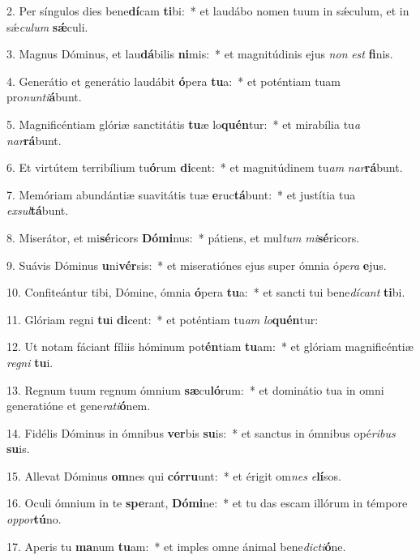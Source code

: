 2. Per síngulos dies bene\textbf{dí}cam \textbf{ti}bi:~*  et laudábo nomen tuum in sǽculum, et in sǽ\textit{cu}\textit{lum} \textbf{sǽ}culi.\

3. Magnus Dóminus, et lau\textbf{dá}bilis \textbf{ni}mis:~*  et magnitúdinis ejus \textit{non} \textit{est} \textbf{fi}nis.\

4. Generátio et generátio laudábit \textbf{ó}pera \textbf{tu}a:~*  et poténtiam tuam pro\textit{nun}\textit{ti}\textbf{á}bunt.\

5. Magnificéntiam glóriæ sanctitátis \textbf{tu}æ lo\textbf{quén}tur:~*  et mirabília tu\textit{a} \textit{nar}\textbf{rá}bunt.\

6. Et virtútem terribílium tu\textbf{ó}rum \textbf{di}cent:~*  et magnitúdinem tu\textit{am} \textit{nar}\textbf{rá}bunt.\

7. Memóriam abundántiæ suavitátis tuæ \textbf{e}ruc\textbf{tá}bunt:~*  et justítia tua \textit{ex}\textit{sul}\textbf{tá}bunt.\

8. Miserátor, et mi\textbf{sé}ricors \textbf{Dó}\textbf{mi}nus:~*  pátiens, et mul\textit{tum} \textit{mi}\textbf{sé}ricors.\

9. Suávis Dóminus \textbf{u}ni\textbf{vér}sis:~*  et miseratiónes ejus super ómnia ó\textit{pe}\textit{ra} \textbf{e}jus.\

10. Confiteántur tibi, Dómine, ómnia \textbf{ó}pera \textbf{tu}a:~*  et sancti tui bene\textit{dí}\textit{cant} \textbf{ti}bi.\

11. Glóriam regni \textbf{tu}i \textbf{di}cent:~*  et poténtiam tu\textit{am} \textit{lo}\textbf{quén}tur:\

12. Ut notam fáciant fíliis hóminum pot\textbf{én}tiam \textbf{tu}am:~*  et glóriam magnificéntiæ \textit{re}\textit{gni} \textbf{tu}i.\

13. Regnum tuum regnum ómnium \textbf{sæ}cu\textbf{ló}rum:~*  et dominátio tua in omni generatióne et gene\textit{ra}\textit{ti}\textbf{ó}nem.\

14. Fidélis Dóminus in ómnibus \textbf{ver}bis \textbf{su}is:~*  et sanctus in ómnibus opé\textit{ri}\textit{bus} \textbf{su}is.\

15. Allevat Dóminus \textbf{om}nes qui \textbf{cór}\textbf{ru}unt:~*  et érigit om\textit{nes} \textit{e}\textbf{lí}sos.\

16. Oculi ómnium in te \textbf{spe}rant, \textbf{Dó}\textbf{mi}ne:~*  et tu das escam illórum in témpore \textit{op}\textit{por}\textbf{tú}no.\

17. Aperis tu \textbf{ma}num \textbf{tu}am:~*  et imples omne ánimal bene\textit{dic}\textit{ti}\textbf{ó}ne.\

